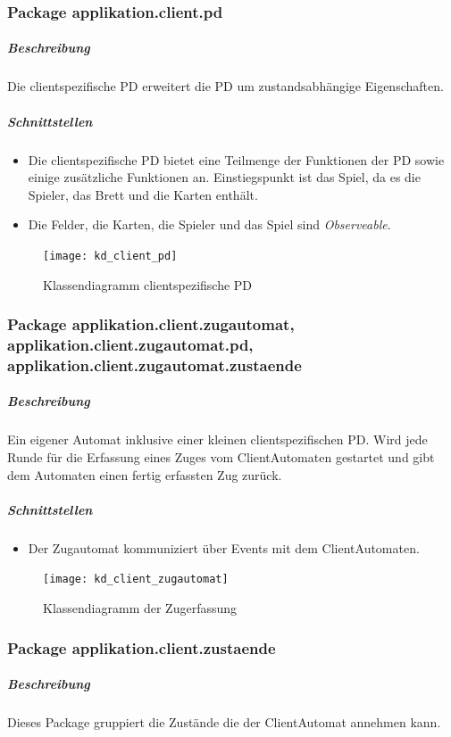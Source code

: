 \documentclass[12pt,halfparskip]{scrartcl}
\begin{document}
	\subsubsection{Package applikation.client.pd}
		\subparagraph{Beschreibung}
		Die clientspezifische PD erweitert die PD um zustandsabhängige Eigenschaften.

		\subparagraph{Schnittstellen}
		\begin{itemize}
			\item Die clientspezifische PD bietet eine Teilmenge der Funktionen der PD sowie einige zusätzliche Funktionen an. Einstiegspunkt ist das Spiel, da es die Spieler, das Brett und die Karten enthält.
			\item Die Felder, die Karten, die Spieler und das Spiel sind \emph{Observeable}.
		\end{itemize}

		\begin{figure}[h]
			\centering
			\texttt{[image: kd\_client\_pd]}
			\caption{Klassendiagramm clientspezifische PD}
			\label{fig:kd_client_pd}
		\end{figure}
		
	\subsubsection{Package applikation.client.zugautomat, applikation.client.zugautomat.pd, applikation.client.zugautomat.zustaende}
		\subparagraph{Beschreibung}
		Ein eigener Automat inklusive einer kleinen clientspezifischen PD. Wird jede Runde für die Erfassung eines Zuges vom ClientAutomaten gestartet und gibt dem Automaten einen fertig erfassten Zug zurück.

		\subparagraph{Schnittstellen}
		\begin{itemize}
			\item Der Zugautomat kommuniziert über Events mit dem ClientAutomaten.
		\end{itemize}
		
		\begin{figure}[h]
			\centering
			\texttt{[image: kd\_client\_zugautomat]}
			\caption{Klassendiagramm der Zugerfassung}
			\label{fig:kd_client_zugautomat}
		\end{figure}
		
	\subsubsection{Package applikation.client.zustaende}
		\subparagraph{Beschreibung}
		Dieses Package gruppiert die Zustände die der ClientAutomat annehmen kann.
\end{document}
